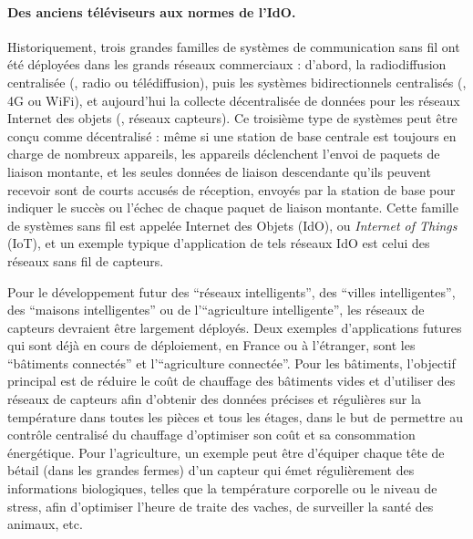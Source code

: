 \begin{resume_fr}
\paragraph{Des anciens téléviseurs aux normes de l'IdO.}
%
Historiquement, trois grandes familles de systèmes de communication sans fil ont été déployées dans les grands réseaux commerciaux : d'abord, la radiodiffusion centralisée (\eg, radio ou télédiffusion), puis les systèmes bidirectionnels centralisés (\eg, 4G ou WiFi), et aujourd'hui la collecte décentralisée de données pour les réseaux Internet des objets (\eg, réseaux capteurs).
%
Ce troisième type de systèmes peut être conçu comme décentralisé :
même si une station de base centrale est toujours en charge de nombreux appareils,
les appareils déclenchent l'envoi de paquets de liaison montante, et les seules données de liaison descendante qu'ils peuvent recevoir sont de courts accusés de réception, envoyés par la station de base pour indiquer le succès ou l'échec de chaque paquet de liaison montante.
Cette famille de systèmes sans fil est appelée Internet des Objets (IdO), ou \emph{Internet of Things} (IoT),
et un exemple typique d'application de tels réseaux IdO est celui des réseaux sans fil de capteurs.

Pour le développement futur des ``réseaux intelligents'', des ``villes intelligentes'', des ``maisons intelligentes'' ou de l'``agriculture intelligente'', les réseaux de capteurs devraient être largement déployés.
Deux exemples d'applications futures qui sont déjà en cours de déploiement, en France ou à l'étranger, sont les ``bâtiments connectés'' et l'``agriculture connectée''.
Pour les bâtiments, l'objectif principal est de réduire le coût de chauffage des bâtiments vides et d'utiliser des réseaux de capteurs afin d'obtenir des données précises et régulières sur la température dans toutes les pièces et tous les étages, dans le but de permettre au contrôle centralisé du chauffage d'optimiser son coût et sa consommation énergétique.
Pour l'agriculture, un exemple peut être d'équiper chaque tête de bétail (dans les grandes fermes) d'un capteur qui émet régulièrement des informations biologiques, telles que la température corporelle ou le niveau de stress, afin d'optimiser l'heure de traite des vaches, de surveiller la santé des animaux, etc.



\end{resume_fr}
